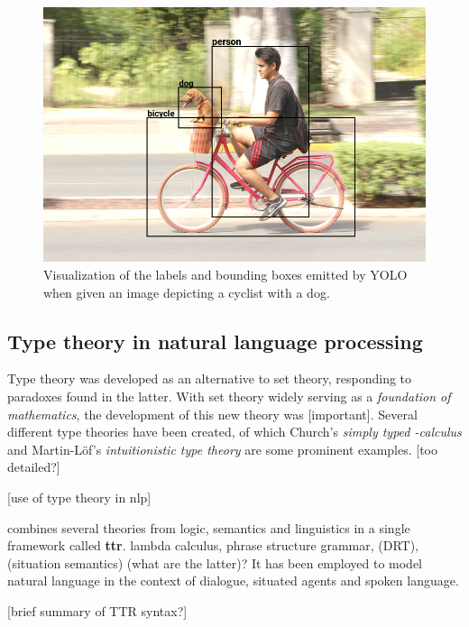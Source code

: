 \documentclass[11pt, a4paper]{article}
\begin{document}
\begin{figure}[h]
\label{fig:dogbike_annotated}
\includegraphics[width=\textwidth]{dogbike_annotated}
\centering
\caption{Visualization of the labels and bounding boxes emitted by YOLO when given an image depicting a cyclist with a dog.}
\end{figure}



\subsection{Type theory in natural language processing}

Type theory was developed as an alternative to set theory, responding to paradoxes found in the latter.
With set theory widely serving as a \textit{foundation of mathematics}, the development of this new theory was [important].
Several different type theories have been created, of which Church's \textit{simply typed \textlambda-calculus} \cite{church40} and Martin-Löf's \textit{intuitionistic type theory} \citep{martinlof84} are some prominent examples.
\citep{CoquandTypeTheory2015} [too detailed?]

[use of type theory in nlp]

\cite{CooperRecordsRecordTypes2005} combines several theories from logic, semantics and linguistics in a single framework called \textbf{\acrfull{ttr}}.
 lambda calculus, phrase structure grammar, (DRT), (situation semantics) (what are the latter)?
It has been employed to model natural language in the context of dialogue, situated agents and spoken language.

[brief summary of TTR syntax?]
\end{document}
